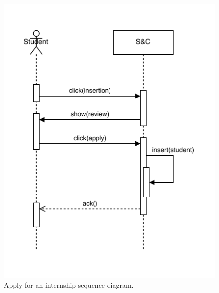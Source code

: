 \begin{figure}[H]
    \begin{center}
        \includegraphics[width=\linewidth]{Images/SequenceDiagram/ApplySD.pdf}
        \caption{Apply for an internship sequence diagram.}
        \label{fig:apply_for_an_internship_seqdiag}%
    \end{center}
\end{figure}


